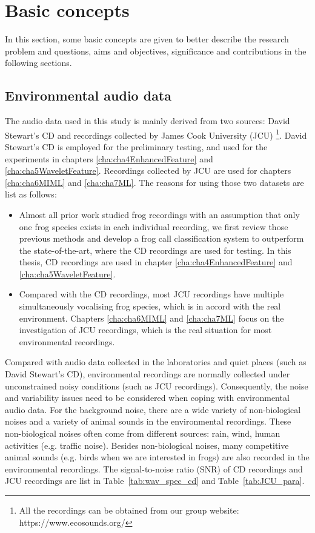\section{Basic concepts} 
In this section, some basic concepts are given to better describe the research problem and questions, aims and objectives, significance and contributions in the following sections.

\subsection{Environmental audio data}
The audio data used in this study is mainly derived from two sources: David Stewart's CD \citep{CD} and recordings collected by James Cook University (JCU) \footnote{All the recordings can be obtained from our group website: https://www.ecosounds.org/}. 
David Stewart's CD is employed for the preliminary testing, and used for the experiments in chapters \ref{cha:cha4EnhancedFeature} and \ref{cha:cha5WaveletFeature}. 
Recordings collected by JCU are used for chapters \ref{cha:cha6MIML} and \ref{cha:cha7ML}. 
The reasons for using those two datasets are list as follows:
\begin{itemize}
\item  Almost all prior work studied frog recordings with an assumption that only one frog species exists in each individual recording, we first review those previous methods and develop a frog call classification system to outperform the state-of-the-art, where the CD recordings are used for testing. In this thesis, CD recordings are used in chapter \ref{cha:cha4EnhancedFeature} and \ref{cha:cha5WaveletFeature}.


\item  Compared with the CD recordings, most JCU recordings have multiple simultaneously vocalising frog species, which is in accord with the real environment. Chapters \ref{cha:cha6MIML} and \ref{cha:cha7ML} focus on the investigation of JCU recordings, which is the real situation for most environmental recordings. 


\end{itemize}


Compared with audio data collected in the laboratories and quiet places (such as David Stewart’s CD), environmental recordings are normally collected under unconstrained noisy conditions (such as JCU recordings). Consequently, the noise and variability issues need to be considered when coping with environmental audio data. 
For the background noise, there are a wide variety of non-biological noises and a variety of animal sounds in the environmental recordings. These non-biological noises often come from different sources: rain, wind, human activities (e.g. traffic noise). Besides non-biological noises, many competitive animal sounds (e.g. birds when we are interested in frogs) are also recorded in the environmental recordings. The signal-to-noise ratio (SNR) of CD recordings and JCU recordings are list in 
Table~\ref{tab:wav_spec_cd} and Table~\ref{tab:JCU_para}. 


